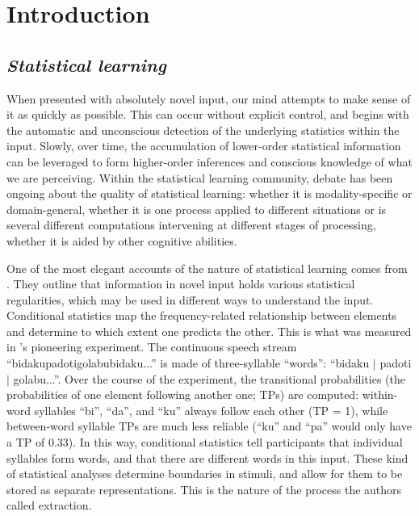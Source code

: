 \section{Introduction}
\label{Introduction}
\setlength{\parindent}{20pt}
\justifying

\subsection{\large{\emph{Statistical learning}}}
\label{SL}
\noindent
When presented with absolutely novel input, our mind attempts to make sense of it as quickly as possible. This can occur without explicit control, and begins with the automatic and unconscious detection of the underlying statistics within the input. Slowly, over time, the accumulation of lower-order statistical information can be leveraged to form higher-order inferences and conscious knowledge of what we are perceiving. Within the statistical learning community, debate has been ongoing about the quality of statistical learning: whether it is modality-specific or domain-general, whether it is one process applied to different situations or is several different computations intervening at different stages of processing, whether it is aided by other cognitive abilities.

One of the most elegant accounts of the nature of statistical learning comes from \textcite{Thiessen2013}. They outline that information in novel input holds various statistical regularities, which may be used in different ways to understand the input. Conditional statistics map the frequency-related relationship between elements and determine to which extent one predicts the other. This is what was measured in \textcite{Saffran1996}'s pioneering experiment. The continuous speech stream ``bidakupadotigolabubidaku...'' is made of three-syllable ``words'': ``bidaku $\vert$ padoti $\vert$ golabu...''. Over the course of the experiment, the transitional probabilities (the probabilities of one element following another one; TPs) are computed: within-word syllables ``bi'', ``da'', and ``ku'' always follow each other (TP = 1), while between-word syllable TPs are much less reliable (``ku'' and ``pa'' would only have a TP of 0.33). In this way, conditional statistics tell participants that individual syllables form words, and that there are different words in this input. These kind of statistical analyses determine boundaries in stimuli, and allow for them to be stored as separate representations. This is the nature of the process the authors called extraction.


